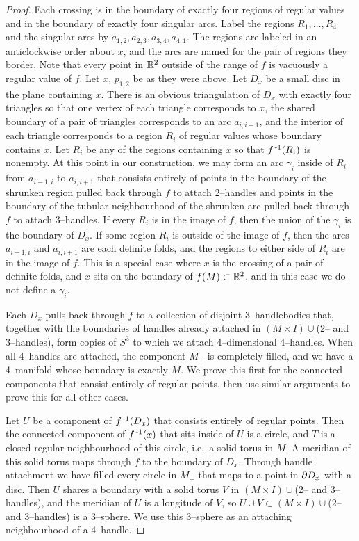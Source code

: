 \begin{proof}
Each crossing is in the boundary of exactly four regions of regular values and in the boundary of exactly four singular arcs.
Label the regions $R_1,\dots,R_4$ and the singular arcs by $a_{1,2},a_{2,3}, a_{3,4}, a_{4,1}$.
The regions are labeled in an anticlockwise order about $x$, and the arcs are named for the pair of regions they border.
Note that every point in $\mathbb{R}^2$ outside of the range of $f$ is vacuously a regular value of $f$.
Let $x$, $p_{1,2}$ be as they were above.
Let $D_x$ be a small disc in the plane containing $x$.
There is an obvious triangulation of $D_x$ with exactly four triangles so that one vertex of each triangle corresponds to $x$, the shared boundary of a pair of triangles corresponds to an arc $a_{i,i+1}$, and the interior of each triangle corresponds to a region $R_i$ of regular values whose boundary contains $x$.
Let $R_i$ be any of the regions containing $x$ so that $f^{\,\text{-}1} (R_i)$ is nonempty.
At this point in our construction, we may form an arc $\gamma_i$ inside of $R_i$ from $a_{i-1,i}$ to $a_{i,i+1}$ that consists entirely of points in the boundary of the shrunken region pulled back through $f$ to attach 2--handles and points in the boundary of the tubular neighbourhood of the shrunken arc pulled back through $f$ to attach 3--handles.
If every $R_i$ is in the image of $f$, then the union of the $\gamma_i$ is the boundary of $D_x$.
If some region $R_i$ is outside of the image of $f$, then the arcs $a_{i-1,i}$ and $a_{i,i+1}$ are each definite folds, and the regions to either side of $R_i$ are in the image of $f$.
This is a special case where $x$ is the crossing of a pair of definite folds, and $x$ sits on the boundary of $f(M)\subset\mathbb{R}^2$, and in this case we do not define a $\gamma_i$.

Each $D_x$ pulls back through $f$ to a collection of disjoint 3--handlebodies that, together with the boundaries of handles already attached in $(M\times I)\cup$({2-- and 3--handles}), form copies of $S^3$ to which we attach 4--dimensional 4--handles.
When all 4--handles are attached, the component $M_+$ is completely filled, and we have a 4--manifold whose boundary is exactly $M$.
We prove this first for the connected components that consist entirely of regular points, then use similar arguments to prove this for all other cases.

Let $U$ be a component of $f^{\,\text{-}1} (D_x)$ that consists entirely of regular points.
Then the connected component of $f^{\,\text{-}1} (x)$ that sits inside of $U$ is a circle, and $T$ is a closed regular neighbourhood of this circle, i.e.\ a solid torus in $M$.
A meridian of this solid torus maps through $f$ to the boundary of $D_x$.
Through handle attachment we have filled every circle in $M_+$ that maps to a point in $\partial D_x$ with a disc.
Then $U$ shares a boundary with a solid torus $V$ in $(M\times I)\cup$(2-- and 3--handles), and the meridian of $U$ is a longitude of $V$, so $U\cup V\subset (M\times I)\cup$(2-- and 3--handles) is a 3--sphere.
We use this 3--sphere as an attaching neighbourhood of a 4--handle.


\end{proof}
